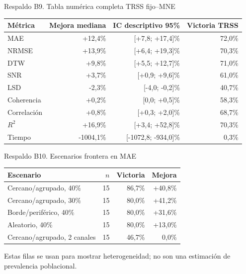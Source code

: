 \documentclass[aspectratio=169,10pt]{beamer}
\begin{document}
\begin{frame}{Respaldo B9. Tabla numérica completa TRSS fijo–MNE}
\scriptsize
\begin{tabular}{@{}lrrr@{}}
\toprule
\textbf{Métrica} & \textbf{Mejora mediana} & \textbf{IC descriptivo 95\%} & \textbf{Victoria TRSS}\\
\midrule
MAE & +12,4\% & [+7,8; +17,4]\% & 72,0\%\\
NRMSE & +13,9\% & [+6,4; +19,3]\% & 70,3\%\\
DTW & +9,8\% & [+5,5; +12,7]\% & 71,0\%\\
SNR & +3,7\% & [+0,9; +9,6]\% & 61,0\%\\
LSD & -2,3\% & [-4,0; -0,2]\% & 40,7\%\\
Coherencia & +0,2\% & [0,0; +0,5]\% & 58,3\%\\
Correlación & +0,8\% & [+0,3; +2,0]\% & 68,7\%\\
$R^2$ & +16,9\% & [+3,4; +52,8]\% & 70,3\%\\
Tiempo & -1004,1\% & [-1072,8; -934,0]\% & 0,3\%\\
\bottomrule
\end{tabular}
\end{frame}

\begin{frame}{Respaldo B10. Escenarios frontera en MAE}
\small
\begin{tabular}{@{}lrrr@{}}
\toprule
\textbf{Escenario} & \textbf{$n$} & \textbf{Victoria} & \textbf{Mejora}\\
\midrule
Cercano/agrupado, 40\% & 15 & 86,7\% & +40,8\%\\
Cercano/agrupado, 30\% & 15 & 80,0\% & +41,2\%\\
Borde/periférico, 40\% & 15 & 80,0\% & +31,6\%\\
Aleatorio, 40\% & 15 & 80,0\% & +13,0\%\\
Cercano/agrupado, 2 canales & 15 & 46,7\% & 0,0\%\\
\bottomrule
\end{tabular}
\vspace{0.5em}
Estas filas se usan para mostrar heterogeneidad; no son una estimación de prevalencia poblacional.
\end{frame}
\end{document}
